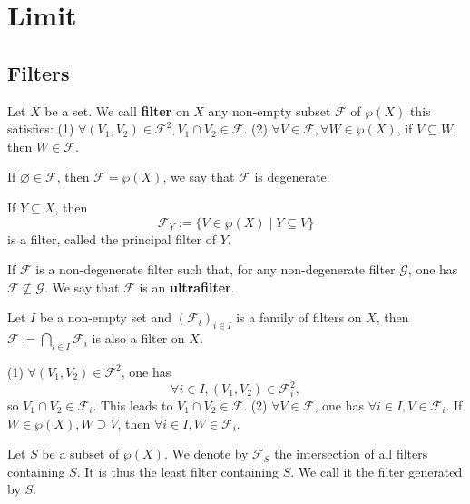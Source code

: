 \chapter{Limit}
\section{Filters}
\begin{definitionenv}
    Let $X$ be a set. We call \textbf{filter} on $X$ any non-empty subset $\mathcal{F}$ of $\wp(X)$ this satisfies:
    \newline
    (1) $\forall(V_1,V_2)\in \mathcal{F}^2, V_1\cap V_2\in \mathcal{F}$.
    \newline
    (2) $ \forall V\in \mathcal{F}, \forall W\in \wp(X)$, if $V\subseteq W$, then $W\in \mathcal{F}$.
\end{definitionenv}
\begin{remark}
    \quad\newline
    If $\varnothing\in \mathcal{F}$, then $\mathcal{F}=\wp(X)$, we say that $\mathcal{F}$ is degenerate.

\begin{exampleenv}
    If $Y\subseteq X$, then 
    $$\mathcal{F}_Y:=\{V\in \wp(X)\mid Y\subseteq V\}$$
    is a filter, called the principal filter of $Y$.
\end{exampleenv}
If $\mathcal{F}$ is a non-degenerate filter such that, for any non-degenerate filter $\mathcal{G}$, one has $\mathcal{F}\nsubseteq \mathcal{G}$. We say that $\mathcal{F}$ is an \textbf{ultrafilter}.
\end{remark}
\begin{propositionenv}
    Let $I$ be a non-empty set and $(\mathcal{F}_i)_{i\in I}$ is a family of filters on $X$, then $\displaystyle \mathcal{F}:=\bigcap_{i\in I}\mathcal{F}_i$ is also a filter on $X$.
\end{propositionenv}
\begin{proofenv}
    \quad
    \newline
    (1) $\forall (V_1,V_2)\in \mathcal{F}^2$, one has 
    $$\forall i\in I, (V_1,V_2)\in \mathcal{F}_i^2,$$
    so $V_1\cap V_2\in \mathcal{F}_i$. This leads to $V_1\cap V_2\in \mathcal{F}$.
    \newline
    (2) $\forall V\in \mathcal{F}$, one has $\forall i\in I, V\in \mathcal{F}_i$. If $W\in \wp(X), W\supseteq V $, then $\forall i\in I, W\in \mathcal{F}_i$.
\end{proofenv}
\begin{definitionenv}
    Let $S$ be a subset of $\wp(X)$. We denote by $\mathcal{F}_S$ the intersection of all filters containing $S$. It is thus the least filter containing $S$. We call it the filter generated by $S$.
\end{definitionenv}
